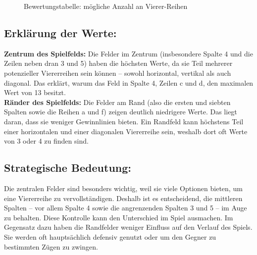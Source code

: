 \begin{figure}[H]
	\caption{Bewertungstabelle: mögliche Anzahl an Vierer-Reihen}

\end{figure}
	
	\subsection*{Erklärung der Werte:}
	\textbf{Zentrum des Spielfelds:} Die Felder im Zentrum (insbesondere Spalte 4 und die Zeilen neben dran 3 und 5) haben die höchsten Werte, da sie Teil mehrerer potenzieller Viererreihen sein können – sowohl horizontal, vertikal als auch diagonal. Das erklärt, warum das Feld in Spalte 4, Zeilen c und d, den maximalen Wert von 13 besitzt.\\
	
	\textbf{Ränder des Spielfelds:} Die Felder am Rand (also die ersten und siebten Spalten sowie die Reihen a und f) zeigen deutlich niedrigere Werte. Das liegt daran, dass sie weniger Gewinnlinien bieten. Ein Randfeld kann höchstens Teil einer horizontalen und einer diagonalen Viererreihe sein, weshalb dort oft Werte von 3 oder 4 zu finden sind.
	
	\subsection*{Strategische Bedeutung:}
	Die zentralen Felder sind besonders wichtig, weil sie viele Optionen bieten, um eine Viererreihe zu vervollständigen. Deshalb ist es entscheidend, die mittleren Spalten – vor allem Spalte 4 sowie die angrenzenden Spalten 3 und 5 – im Auge zu behalten. Diese Kontrolle kann den Unterschied im Spiel ausmachen.
	Im Gegensatz dazu haben die Randfelder weniger Einfluss auf den Verlauf des Spiels. Sie werden oft hauptsächlich defensiv genutzt oder um den Gegner zu bestimmten Zügen zu zwingen.
	
